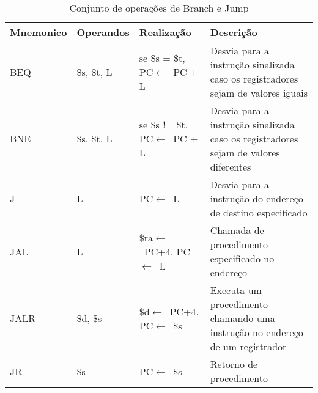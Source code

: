 \documentclass{report}
\begin{document}
	\FloatBarrier
    \begin{table}[H]
      \begin{center}
        \begin{tabular}[pos]{|m{3cm}|m{2.8cm}|m{3cm}|m{4cm}|} 
         \hline
          \cellcolor[gray]{0.9}\textbf{Mnemonico} & \cellcolor[gray]{0.9}\textbf{Operandos} & \cellcolor[gray]{0.9}\textbf{Realização} & \cellcolor[gray]{0.9}\textbf{Descrição} \\ \hline
              BEQ  & \$s, \$t, L & se \$s = \$t, PC$\leftarrow$\ PC + L  &  Desvia para a instrução sinalizada caso os registradores sejam de valores iguais\\ \hline
              BNE  & \$s, \$t, L & se \$s != \$t, PC$\leftarrow$\ PC + L &  Desvia para a instrução sinalizada caso os registradores sejam de valores diferentes\\ \hline
              J  & L & PC$\leftarrow$\ L &  Desvia para a instrução do endereço de destino especificado\\ \hline
              JAL  & L & \$ra$\leftarrow$\ PC+4, PC$\leftarrow$\ L &  Chamada de procedimento especificado no endereço\\ \hline
              JALR  &  \$d, \$s & \$d$\leftarrow$\ PC+4, PC$\leftarrow$\ \$s &  Executa um procedimento chamando uma instrução no endereço de um registrador\\ \hline 
              JR  &\$s & PC$\leftarrow$\ \$s & Retorno de procedimento\\ \hline 
                         
        \end{tabular}
        \caption{Conjunto de operações de Branch e Jump}
		\label{table:conjOpBraJum}
      \end{center}
    \end{table}
    
\end{document}
